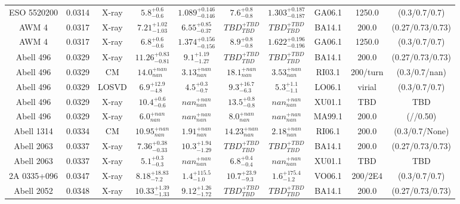 \begin{table}
\begin{tabular}{cccccccccc}
ESO 5520200 & 0.0314 & X-ray & ${5.8}^{+0.6}_{-0.6}$ & ${1.089}^{+0.146}_{-0.146}$ & ${7.6}^{+0.8}_{-0.8}$ & ${1.303}^{+0.187}_{-0.187}$ & GA06.1 & 1250.0 & (0.3/0.7/0.7) \\
AWM 4 & 0.0317 & X-ray & ${7.21}^{+1.02}_{-1.03}$ & ${6.55}^{+0.85}_{-0.37}$ & ${TBD}^{+TBD}_{TBD}$ & ${TBD}^{+TBD}_{TBD}$ & BA14.1 & 200.0 & (0.27/0.73/0.73) \\
AWM 4 & 0.0317 & X-ray & ${6.8}^{+0.6}_{-0.6}$ & ${1.374}^{+0.156}_{-0.156}$ & ${8.9}^{+0.8}_{-0.8}$ & ${1.622}^{+0.196}_{-0.196}$ & GA06.1 & 1250.0 & (0.3/0.7/0.7) \\
Abell 496 & 0.0329 & X-ray & ${11.26}^{+0.83}_{-0.81}$ & ${9.1}^{+1.19}_{-1.27}$ & ${TBD}^{+TBD}_{TBD}$ & ${TBD}^{+TBD}_{TBD}$ & BA14.1 & 200.0 & (0.27/0.73/0.73) \\
Abell 496 & 0.0329 & CM & ${14.0}^{+nan}_{nan}$ & ${3.13}^{+nan}_{nan}$ & ${18.1}^{+nan}_{nan}$ & ${3.53}^{+nan}_{nan}$ & RI03.1 & 200/turn & (0.3/0.7/nan) \\
Abell 496 & 0.0329 & LOSVD & ${6.9}^{+12.9}_{-4.8}$ & ${4.5}^{+0.3}_{-0.7}$ & ${9.3}^{+16.7}_{-6.3}$ & ${5.3}^{+1.1}_{-1.1}$ & LO06.1 & virial & (0.3/0.7/0.7) \\
Abell 496 & 0.0329 & X-ray & ${10.4}^{+0.6}_{-0.6}$ & ${nan}^{+nan}_{nan}$ & ${13.5}^{+0.8}_{-0.8}$ & ${nan}^{+nan}_{nan}$ & XU01.1 & TBD & TBD \\
Abell 496 & 0.0329 & X-ray & ${6.0}^{+nan}_{nan}$ & ${nan}^{+nan}_{nan}$ & ${8.0}^{+nan}_{nan}$ & ${nan}^{+nan}_{nan}$ & MA99.1 & 200.0 & (//0.50) \\
Abell 1314 & 0.0334 & CM & ${10.95}^{+nan}_{nan}$ & ${1.91}^{+nan}_{nan}$ & ${14.23}^{+nan}_{nan}$ & ${2.18}^{+nan}_{nan}$ & RI06.1 & 200.0 & (0.3/0.7/None) \\
Abell 2063 & 0.0337 & X-ray & ${7.36}^{+0.38}_{-0.33}$ & ${10.3}^{+1.94}_{-1.29}$ & ${TBD}^{+TBD}_{TBD}$ & ${TBD}^{+TBD}_{TBD}$ & BA14.1 & 200.0 & (0.27/0.73/0.73) \\
Abell 2063 & 0.0337 & X-ray & ${5.1}^{+0.3}_{-0.3}$ & ${nan}^{+nan}_{nan}$ & ${6.8}^{+0.4}_{-0.4}$ & ${nan}^{+nan}_{nan}$ & XU01.1 & TBD & TBD \\
2A 0335+096 & 0.0347 & X-ray & ${8.18}^{+18.83}_{-7.2}$ & ${1.4}^{+115.5}_{-1.0}$ & ${10.7}^{+23.9}_{-9.3}$ & ${1.6}^{+175.4}_{-1.2}$ & VO06.1 & 200/2E4 & (0.3/0.7/0.7) \\
Abell 2052 & 0.0348 & X-ray & ${10.33}^{+1.39}_{-1.33}$ & ${9.12}^{+1.26}_{-1.72}$ & ${TBD}^{+TBD}_{TBD}$ & ${TBD}^{+TBD}_{TBD}$ & BA14.1 & 200.0 & (0.27/0.73/0.73) \\

\end{tabular}
\end{table}
